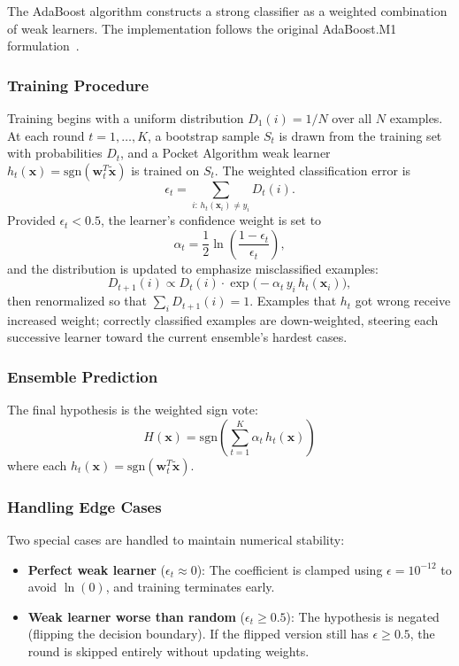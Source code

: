 \documentclass{acm_proc_article-sp}
\begin{document}
The AdaBoost algorithm constructs a strong classifier as a weighted combination of weak learners. The implementation follows the original AdaBoost.M1 formulation~\cite{freund1997}.

\subsubsection{Training Procedure}
Training begins with a uniform distribution $D_1(i) = 1/N$ over all $N$ examples. At each round $t = 1, \ldots, K$, a bootstrap sample $S_t$ is drawn from the training set with probabilities $D_t$, and a Pocket Algorithm weak learner $h_t(\mathbf{x}) = \text{sgn}(\mathbf{w}_t^T \tilde{\mathbf{x}})$ is trained on $S_t$. The weighted classification error is
\begin{equation}
\epsilon_t = \sum_{i:\, h_t(\mathbf{x}_i) \neq y_i} D_t(i).
\end{equation}
Provided $\epsilon_t < 0.5$, the learner's confidence weight is set to
\begin{equation}
\alpha_t = \frac{1}{2}\ln\!\left(\frac{1 - \epsilon_t}{\epsilon_t}\right),
\end{equation}
and the distribution is updated to emphasize misclassified examples:
\begin{equation}
D_{t+1}(i) \propto D_t(i) \cdot \exp\!\bigl(-\alpha_t\, y_i\, h_t(\mathbf{x}_i)\bigr),
\end{equation}
then renormalized so that $\sum_i D_{t+1}(i) = 1$. Examples that $h_t$ got wrong receive increased weight; correctly classified examples are down-weighted, steering each successive learner toward the current ensemble's hardest cases.

\subsubsection{Ensemble Prediction}
The final hypothesis is the weighted sign vote:
\begin{equation}
H(\mathbf{x}) = \text{sgn}\!\left(\sum_{t=1}^{K} \alpha_t \, h_t(\mathbf{x})\right)
\end{equation}
where each $h_t(\mathbf{x}) = \text{sgn}(\mathbf{w}_t^T \tilde{\mathbf{x}})$.

\subsubsection{Handling Edge Cases}
Two special cases are handled to maintain numerical stability:
\begin{itemize}
\item \textbf{Perfect weak learner} ($\epsilon_t \approx 0$): The coefficient is clamped using $\epsilon = 10^{-12}$ to avoid $\ln(0)$, and training terminates early.
\item \textbf{Weak learner worse than random} ($\epsilon_t \geq 0.5$): The hypothesis is negated (flipping the decision boundary). If the flipped version still has $\epsilon \geq 0.5$, the round is skipped entirely without updating weights.
\end{itemize}
\end{document}
